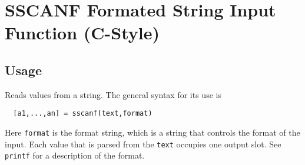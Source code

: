 \section{SSCANF Formated String Input Function (C-Style)}

\subsection{Usage}

Reads values from a string.  The general syntax for its use is
\begin{verbatim}
  [a1,...,an] = sscanf(text,format)
\end{verbatim}
Here \verb|format| is the format string, which is a string that
controls the format of the input.  Each value that is parsed
from the \verb|text| occupies one output slot.  See \verb|printf|
for a description of the format.
